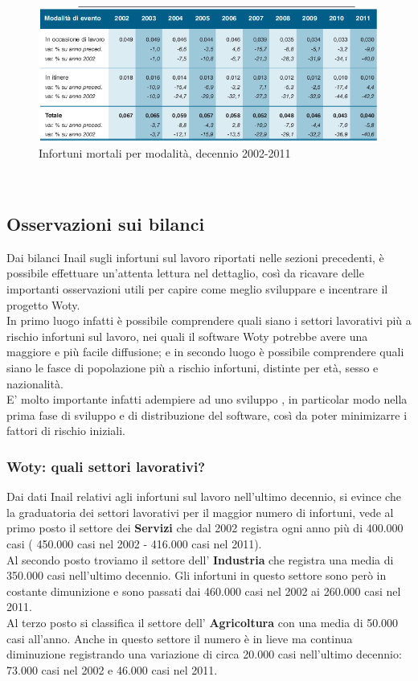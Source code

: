 \begin{figure}[H]
\centering
\includegraphics[scale=0.6]{images/analisiDiMercato/infortuniDecennioMortaliPerModalita2}
\caption{Infortuni mortali per modalità, decennio 2002-2011}
\end{figure}




\ \ \
\subsection{Osservazioni sui bilanci}
Dai bilanci Inail sugli infortuni sul lavoro riportati nelle sezioni precedenti, è possibile effettuare un'attenta lettura nel dettaglio, così da ricavare delle importanti osservazioni utili per capire come meglio sviluppare e incentrare il progetto Woty.\\
In primo luogo infatti è possibile comprendere quali siano i settori lavorativi più a rischio infortuni sul lavoro, nei quali il software Woty potrebbe avere una maggiore e più facile diffusione; e in secondo luogo è possibile comprendere quali siano le fasce di popolazione più a rischio infortuni, distinte per età, sesso e nazionalità.\\
E' molto importante infatti adempiere ad uno sviluppo \virgolette{mirato}, in particolar modo nella prima fase di sviluppo e di distribuzione del software, così da poter minimizarre i fattori di rischio iniziali.\\


\subsubsection{Woty: quali settori lavorativi?}
Dai dati Inail relativi agli infortuni sul lavoro nell'ultimo decennio, si evince che la graduatoria dei settori lavorativi per il maggior numero di infortuni, vede al primo posto il settore dei \textbf{Servizi} che dal 2002 registra ogni anno più di 400.000 casi ( 450.000 casi nel 2002 - 416.000 casi nel 2011).\\
Al secondo posto troviamo il settore dell' \textbf{Industria} che registra una media di 350.000 casi nell'ultimo decennio. Gli infortuni in questo settore sono però in costante dimunizione e sono passati dai 460.000 casi nel 2002 ai 260.000 casi nel 2011.\\
Al terzo posto si classifica il settore dell' \textbf{Agricoltura} con una media di 50.000 casi all'anno. Anche in questo settore il numero è in lieve ma continua diminuzione registrando una variazione di circa 20.000 casi nell'ultimo decennio: 73.000 casi nel 2002 e 46.000 casi nel 2011.\\

